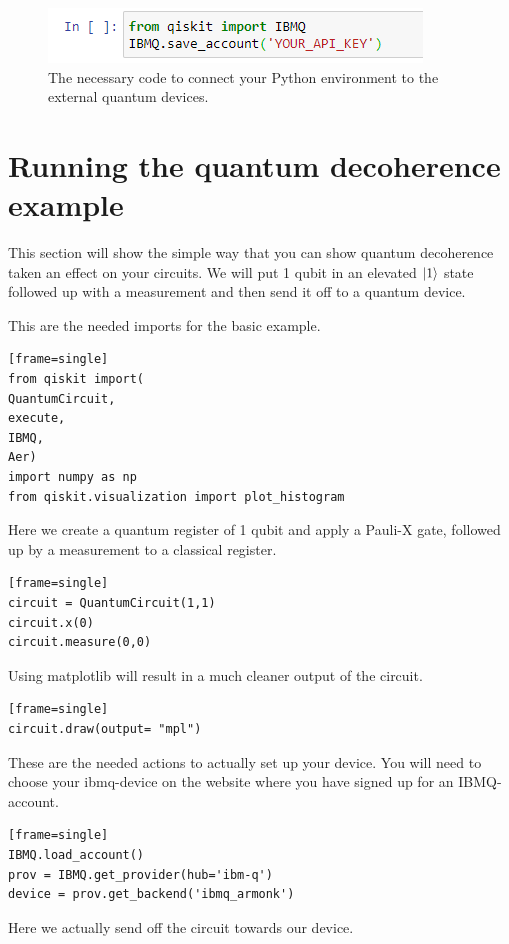 \begin{figure}
	\centering
	\includegraphics[scale = 0.75]{../Demonstration/img/IBMQ.PNG}
	\caption{The necessary code to connect your Python environment to the external quantum devices.}
\end{figure}


\section{Running the quantum decoherence example}
This section will show the simple way that you can show quantum decoherence taken an effect on your circuits. We will put 1 qubit in an elevated $\ket{1}$ state followed up with a measurement and then send it off to a quantum device.

This are the needed imports for the basic example.

\begin{verbatim}[frame=single]
from qiskit import(
QuantumCircuit,
execute, 
IBMQ,
Aer)
import numpy as np
from qiskit.visualization import plot_histogram
\end{verbatim}

Here we create a quantum register of 1 qubit and apply a Pauli-X gate, followed up by a measurement to a classical register.

\begin{verbatim}[frame=single]
circuit = QuantumCircuit(1,1)
circuit.x(0)
circuit.measure(0,0)
\end{verbatim}

Using matplotlib will result in a much cleaner output of the circuit.

\begin{verbatim}[frame=single]
circuit.draw(output= "mpl")
\end{verbatim}

These are the needed actions to actually set up your device. You will need to choose your ibmq-device on the website where you have signed up for an IBMQ-account.

\begin{verbatim}[frame=single]
IBMQ.load_account()
prov = IBMQ.get_provider(hub='ibm-q')
device = prov.get_backend('ibmq_armonk')
\end{verbatim}

Here we actually send off the circuit towards our device.

